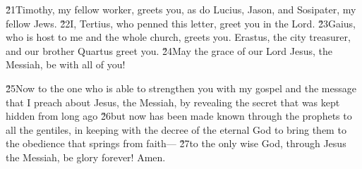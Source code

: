 \v{21}Timothy, my fellow worker, greets you, as do Lucius, Jason, and Sosipater, my fellow Jews. \v{22}I, Tertius, who penned this letter, greet you in the Lord. \v{23}Gaius, who is host to me and the whole church, greets you. Erastus, the city treasurer, and our brother Quartus greet you. \v{24}May the grace of our Lord Jesus, the Messiah, be with all of you!

\v{25}Now to the one who is able to strengthen you with my gospel and the message that I preach about Jesus, the Messiah, by revealing the secret that was kept hidden from long ago \v{26}but now has been made known through the prophets to all the gentiles, in keeping with the decree of the eternal God to bring them to the obedience that springs from faith--- \v{27}to the only wise God, through Jesus the Messiah, be glory forever! Amen.
